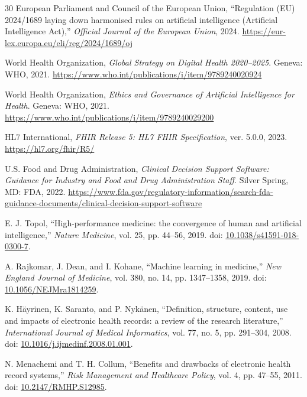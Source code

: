\documentclass[11pt,a4paper]{article}
\begin{document}
\begin{thebibliography}{30}
		European Parliament and Council of the European Union, ``Regulation (EU) 2024/1689 laying down harmonised rules on artificial intelligence (Artificial Intelligence Act),'' \emph{Official Journal of the European Union}, 2024. \url{https://eur-lex.europa.eu/eli/reg/2024/1689/oj}
		
		World Health Organization, \emph{Global Strategy on Digital Health 2020--2025}. Geneva: WHO, 2021. \url{https://www.who.int/publications/i/item/9789240020924}
		
		World Health Organization, \emph{Ethics and Governance of Artificial Intelligence for Health}. Geneva: WHO, 2021. \url{https://www.who.int/publications/i/item/9789240029200}
		
		HL7 International, \emph{FHIR Release 5: HL7 FHIR Specification}, ver. 5.0.0, 2023. \url{https://hl7.org/fhir/R5/}
		
		U.S. Food and Drug Administration, \emph{Clinical Decision Support Software: Guidance for Industry and Food and Drug Administration Staff}. Silver Spring, MD: FDA, 2022. \url{https://www.fda.gov/regulatory-information/search-fda-guidance-documents/clinical-decision-support-software}
		
		E. J. Topol, ``High-performance medicine: the convergence of human and artificial intelligence,'' \emph{Nature Medicine}, vol. 25, pp. 44--56, 2019. doi: \href{https://doi.org/10.1038/s41591-018-0300-7}{10.1038/s41591-018-0300-7}.
		
		A. Rajkomar, J. Dean, and I. Kohane, ``Machine learning in medicine,'' \emph{New England Journal of Medicine}, vol. 380, no. 14, pp. 1347--1358, 2019. doi: \href{https://doi.org/10.1056/NEJMra1814259}{10.1056/NEJMra1814259}.
		
		K. H\"ayrinen, K. Saranto, and P. Nyk\"anen, ``Definition, structure, content, use and impacts of electronic health records: a review of the research literature,'' \emph{International Journal of Medical Informatics}, vol. 77, no. 5, pp. 291--304, 2008. doi: \href{https://doi.org/10.1016/j.ijmedinf.2008.01.001}{10.1016/j.ijmedinf.2008.01.001}.
		
		N. Menachemi and T. H. Collum, ``Benefits and drawbacks of electronic health record systems,'' \emph{Risk Management and Healthcare Policy}, vol. 4, pp. 47--55, 2011. doi: \href{https://doi.org/10.2147/RMHP.S12985}{10.2147/RMHP.S12985}.
		

\end{thebibliography}
\end{document}
